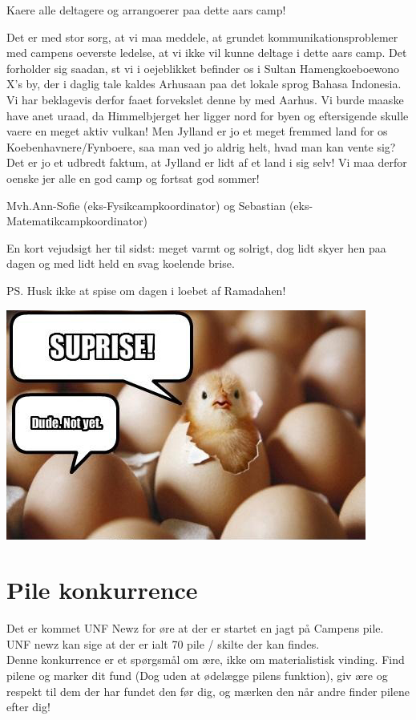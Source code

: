 \begin{minipage}[b]{0.95\linewidth}
\begin{minipage}[t]{0.47\textwidth}
Kaere alle deltagere og arrangoerer paa dette aars camp!

Det er med stor sorg, at vi maa meddele, at grundet kommunikationsproblemer med campens oeverste ledelse, at vi ikke vil kunne deltage i dette aars camp. 
Det forholder sig saadan, st vi i oejeblikket befinder os i Sultan Hamengkoeboewono X's by, der i daglig tale kaldes Arhusaan paa det lokale sprog Bahasa Indonesia. 
Vi har beklagevis derfor faaet forvekslet denne by med Aarhus. Vi burde maaske have anet uraad, da Himmelbjerget her ligger nord for byen og eftersigende skulle vaere en meget aktiv vulkan! Men Jylland er jo et meget fremmed land for os Koebenhavnere/Fynboere, saa man ved jo aldrig helt, hvad man kan vente sig? Det er jo et udbredt faktum, at Jylland er lidt af et land i sig selv!
Vi maa derfor oenske jer alle en god camp og fortsat god sommer!

Mvh.Ann-Sofie (eks-Fysikcampkoordinator) og Sebastian (eks-Matematikcampkoordinator)

En kort vejudsigt her til sidst: meget varmt og solrigt, dog lidt skyer hen paa dagen og med lidt held en svag koelende brise.

PS. Husk ikke at spise om dagen i loebet af Ramadahen!

\vspace{2mm}

\includegraphics[width=\linewidth]{suprise.jpg}

\vspace{-4mm}
\section*{Pile konkurrence}
Det er kommet UNF Newz for øre at der er startet en jagt på Campens pile. UNF newz kan sige at der er ialt 70 pile / skilte der kan findes. \\
Denne konkurrence er et spørgsmål om ære, ikke om materialistisk vinding. Find pilene og marker dit fund (Dog uden at ødelægge pilens funktion), giv ære og respekt til dem der har fundet den før dig, og mærken den når andre finder pilene efter dig!



\end{minipage}
\end{minipage}
